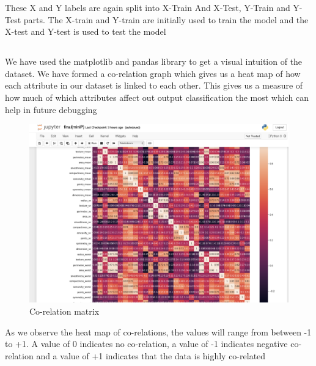 \documentclass[12pt]{article}
\newcommand{\msize}{\fontsize{14pt}{12pt}\selectfont}
\begin{document}
These X and Y labels are again split into X-Train And X-Test, Y-Train and Y-Test parts. The X-train and Y-train are initially used to train the model and the X-test and Y-test is used to test the model 
\newpage 
\subsection{\msize{\textbf{VISUAL ANALYSIS}}}
We have used the matplotlib and pandas library to get a visual intuition of the dataset. We have formed a co-relation graph which gives us a heat map of how each attribute in our dataset is linked to each other. This gives us a measure of how much of which attributes affect out output classification the most which can help in future debugging 	 

\begin{center}
\begin{figure}[h]
\centerline{\includegraphics[scale=.4]{co.png}}
\caption{Co-relation matrix}
\end{figure}
\end{center}

As we observe the heat map of co-relations, the values will range from between -1 to +1. A value of 0 indicates no co-relation, a value of -1 indicates negative co-relation and a value of +1 indicates that the data is highly co-related 
\end{document}
